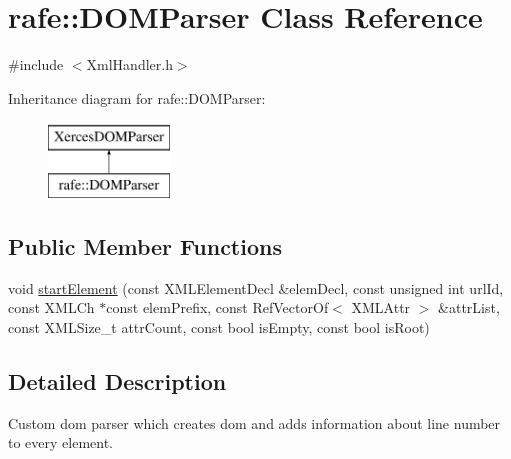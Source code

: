 \hypertarget{classrafe_1_1_d_o_m_parser}{\section{rafe\+:\+:D\+O\+M\+Parser Class Reference}
\label{classrafe_1_1_d_o_m_parser}
}


{\ttfamily \#include $<$Xml\+Handler.\+h$>$}

Inheritance diagram for rafe\+:\+:D\+O\+M\+Parser\+:\begin{figure}[H]
\begin{center}
\leavevmode
\includegraphics[height=2.000000cm]{classrafe_1_1_d_o_m_parser}
\end{center}
\end{figure}
\subsection*{Public Member Functions}
\begin{DoxyCompactItemize}
\item 
void \hyperlink{classrafe_1_1_d_o_m_parser_ac9621821b9b1030a1caee5a27454855c}{start\+Element} (const X\+M\+L\+Element\+Decl \&elem\+Decl, const unsigned int url\+Id, const X\+M\+L\+Ch $\ast$const elem\+Prefix, const Ref\+Vector\+Of$<$ X\+M\+L\+Attr $>$ \&attr\+List, const X\+M\+L\+Size\+\_\+t attr\+Count, const bool is\+Empty, const bool is\+Root)
\end{DoxyCompactItemize}


\subsection{Detailed Description}
Custom dom parser which creates dom and adds information about line number to every element. 

